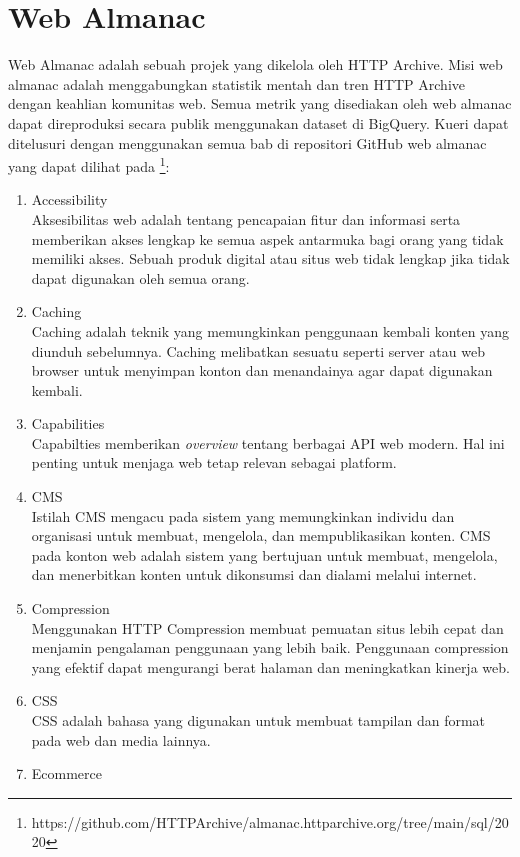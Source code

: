 \section{Web Almanac \cite{webalmanacMetho}}
Web Almanac adalah sebuah projek yang dikelola oleh HTTP Archive. Misi web almanac adalah menggabungkan statistik mentah dan tren HTTP Archive dengan keahlian komunitas web. Semua metrik yang disediakan oleh web almanac dapat direproduksi secara publik menggunakan dataset di BigQuery. Kueri dapat ditelusuri dengan menggunakan semua bab di repositori GitHub web almanac yang dapat dilihat pada \footnote{https://github.com/HTTPArchive/almanac.httparchive.org/tree/main/sql/2020}: 
\begin{enumerate}
	\item Accessibility\\
	Aksesibilitas web adalah tentang pencapaian fitur dan informasi serta memberikan akses lengkap ke semua aspek antarmuka bagi orang yang tidak memiliki akses. Sebuah produk digital atau situs web tidak lengkap jika tidak dapat digunakan oleh semua orang. 
	\item Caching\\
	Caching adalah teknik yang memungkinkan penggunaan kembali konten yang diunduh sebelumnya. Caching melibatkan sesuatu seperti server atau web browser untuk menyimpan konton dan menandainya agar dapat digunakan kembali.
	\item Capabilities\\
	Capabilties memberikan \textit{overview} tentang berbagai API web modern. Hal ini penting untuk menjaga web tetap relevan sebagai platform. 
	\item CMS\\
	Istilah CMS mengacu pada sistem yang memungkinkan individu dan organisasi untuk membuat, mengelola, dan mempublikasikan konten. CMS pada konton web adalah sistem yang bertujuan untuk membuat, mengelola, dan menerbitkan konten untuk dikonsumsi dan dialami melalui internet.
	\item Compression\\
	Menggunakan HTTP Compression membuat pemuatan situs lebih cepat dan menjamin pengalaman penggunaan yang lebih baik. Penggunaan compression yang efektif dapat mengurangi berat halaman dan meningkatkan kinerja web.
	\item CSS\\
	CSS adalah bahasa yang digunakan untuk membuat tampilan dan format pada web dan media lainnya.
	\item Ecommerce\\

\end{enumerate}
